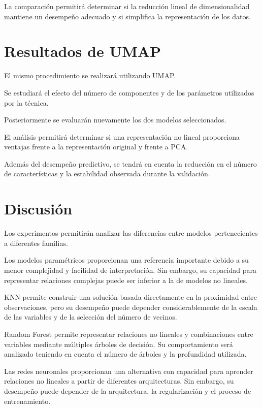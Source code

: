 \documentclass[conference]{IEEEtran}
\begin{document}
La comparación permitirá determinar si la reducción lineal de dimensionalidad mantiene un desempeño adecuado y si simplifica la representación de los datos.


\section{Resultados de UMAP}

El mismo procedimiento se realizará utilizando UMAP.

Se estudiará el efecto del número de componentes y de los parámetros utilizados por la técnica.

Posteriormente se evaluarán nuevamente los dos modelos seleccionados.

El análisis permitirá determinar si una representación no lineal proporciona ventajas frente a la representación original y frente a PCA.

Además del desempeño predictivo, se tendrá en cuenta la reducción en el número de características y la estabilidad observada durante la validación.


\section{Discusión}

Los experimentos permitirán analizar las diferencias entre modelos pertenecientes a diferentes familias.

Los modelos paramétricos proporcionan una referencia importante debido a su menor complejidad y facilidad de interpretación. Sin embargo, su capacidad para representar relaciones complejas puede ser inferior a la de modelos no lineales.

KNN permite construir una solución basada directamente en la proximidad entre observaciones, pero su desempeño puede depender considerablemente de la escala de las variables y de la selección del número de vecinos.

Random Forest permite representar relaciones no lineales y combinaciones entre variables mediante múltiples árboles de decisión. Su comportamiento será analizado teniendo en cuenta el número de árboles y la profundidad utilizada.

Las redes neuronales proporcionan una alternativa con capacidad para aprender relaciones no lineales a partir de diferentes arquitecturas. Sin embargo, su desempeño puede depender de la arquitectura, la regularización y el proceso de entrenamiento.
\end{document}

